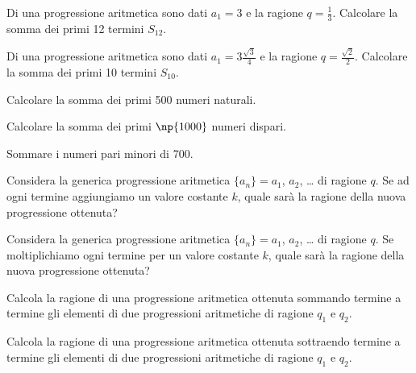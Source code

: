 \begin{esercizio}
\label{ese:8a_progr.10}
Di una progressione aritmetica sono dati $a_1=3$ e la ragione $q=\frac{1}{3}$. Calcolare la somma dei primi 12 termini $S_{12}$.
\end{esercizio}

\begin{esercizio}
\label{ese:8a_progr.11}
Di una progressione aritmetica sono dati $a_1=3\frac{\sqrt{3}}{4}$ e la ragione $q=\frac{\sqrt{2}}{2}$. Calcolare la somma dei primi 10 termini $S_{10}$.
\end{esercizio}

\begin{esercizio}
\label{ese:8a_progr.12}
Calcolare la somma dei primi 500 numeri naturali.
\end{esercizio}

\begin{esercizio}
\label{ese:8a_progr.13}
Calcolare la somma dei primi $\np{1000}$ numeri dispari.
\end{esercizio}

\begin{esercizio}
\label{ese:8a_progr.14}
Sommare i numeri pari minori di 700.
\end{esercizio}

\begin{esercizio}
\label{ese:8a_progr.15}
Considera la generica progressione aritmetica $\{a_n\} = a_1$, $a_2$, \ldots{} di ragione $q$. Se ad ogni termine aggiungiamo un valore costante $k$, quale sarà la ragione della nuova progressione ottenuta?
\end{esercizio}

\begin{esercizio}
\label{ese:8a_progr.16}
Considera la generica progressione aritmetica $\{a_n\} = a_1$, $a_2$, \ldots{} di ragione $q$. Se moltiplichiamo ogni termine per un valore costante $k$, quale sarà la ragione della nuova progressione ottenuta?
\end{esercizio}

\begin{esercizio}
\label{ese:8a_progr.17}
Calcola la ragione di una progressione aritmetica ottenuta sommando termine a termine gli elementi di due progressioni aritmetiche di ragione $q_1$ e $q_2$.
\end{esercizio}

\begin{esercizio}
\label{ese:8a_progr.18}
Calcola la ragione di una progressione aritmetica ottenuta sottraendo termine a termine gli elementi di due progressioni aritmetiche di ragione $q_1$ e $q_2$.
\end{esercizio}

